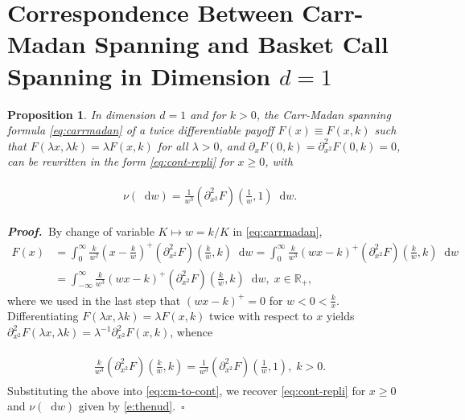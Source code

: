 \documentclass[11pt,A4,twoside]{article}
\numberwithin{equation}{section}
\renewcommand*\d{\mathop{}\!\mathrm{d}}
\newcommand{\R}{\mathbbm{R}}
\newcommand{\beqa}{\begin{eqnarray}}
\newcommand{\eeqa}{\end{eqnarray}}
\def\bal{\begin{aligned}}
\def\eal{\end{aligned}}
\def\bll#1{
\beqa\label{#1}\bal
}\def\lel{\eal\eeqa}
\newcommand{\beql}[1]{\bll{#1}}
\newcommand{\eeql}{\lel}
\newtheorem{proposition}[theorem]{Proposition}
\theoremstyle{definition}
\theoremstyle{remark}
\def\sp{,\;}
\def\R{\mathbb{R}}
\def\finproof {$\Box$ \vskip 5 pt }\def\finproof{\rule{4pt}{6pt}}\def\finproof{\ensuremath{\square}}
\def\proof{\noindent \emph{\textbf{Proof.} $\, $}}
\begin{document}
{\section{Correspondence Between Carr-Madan Spanning and Basket Call Spanning in Dimension $d = 1$}\label{a:carr-madan}

 \begin{proposition}\label{p:carr-madan}
    In dimension $d=1$ and for $k>0$, the Carr-Madan spanning formula \eqref{eq:carrmadan} of a twice differentiable  
    payoff $F(x)\equiv F(x,k)$ such that $ F(\lambda x,\lambda k)= \lambda  F(x,k)$  for all $\lambda>0$, and $\partial_x F(0,k) =  \partial^2_{x^2} F(0,k) = 0$,
    can be rewritten in the form \eqref{eq:cont-repli} for $x\ge 0$, with
\beql{e:thenud}
\nu(\d w) = \frac{1}{w^3}(\partial^2_{x^2}F)\left(\frac{1}{w}, 1\right)\d w .\eeql      
 \end{proposition}

\proof By change of variable $K\mapsto w = k/K $ in \eqref{eq:carrmadan},
   \begin{align}
       F(x) &= \int_0^\infty  \frac{k}{w^2} \left( x - \frac{k}{w}\right)^+ (\partial^2_{x^2}F)\left(\frac{k}{w}, k\right)\d w = \int_0^\infty  \frac{k}{w^3} \left( wx - {k}\right)^+ (\partial^2_{x^2}F)\left(\frac{k}{w}, k\right)\d w \nonumber\\
       &= \int_{-\infty}^\infty  \frac{k}{w^3} \left( wx - {k}\right)^+ (\partial^2_{x^2}F)\left(\frac{k}{w}, k\right)\d w\sp  x\in \R_+ , \label{eq:cm-to-cont}
   \end{align}
    where we used in the last step that $(wx - k)^+ = 0 $ 
    for $w< 0<\frac{k}{x}$. Differentiating $F(\lambda x, \lambda k) =  \lambda F(x,k)$ twice with respect to $x$ yields $ \partial^2_{x^2}F(\lambda x,\lambda k) =  \lambda^{-1} \partial^2_{x^2}F(x, k) $, whence
    \beql{e:ahd}\frac{k}{w^3}(\partial^2_{x^2}F)\left(\frac{k}{w}, k\right) = \frac{1}{w^3} (\partial^2_{x^2}F)\left(\frac{1}{w}, 1\right)\sp k>0.
    \eeql
    Substituting the above into \eqref{eq:cm-to-cont}, we recover \eqref{eq:cont-repli} for $ x \geq 0$  and $\nu(\d w)$ given by \eqref{e:thenud}.\ \finproof
 
}
\end{document}
